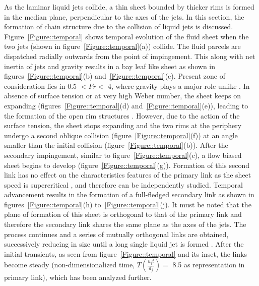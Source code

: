 \documentclass[%
 aip,
 sd,%
amsmath,amssymb,
preprint,%
author-year,%
]{revtex4-1}
\begin{document}
As the laminar liquid jets collide, a thin sheet bounded by thicker rims is formed in the median plane, perpendicular to the axes of the jets. In this section, the {\color{red}formation} of chain structure due to the collision of liquid jets is discussed. Figure~\ref{Figure::temporal} shows temporal evolution of the fluid sheet when the two jets (shown in figure~\ref{Figure::temporal}(a)) collide. The fluid parcels are dispatched radially outwards from the point of impingement. This along with net inertia of jets and gravity results in a bay leaf like sheet as shown in figures~\ref{Figure::temporal}(b) and~\ref{Figure::temporal}(c). Present zone of consideration lies in 0.5 $< Fr <$ 4, where gravity plays a major role unlike \cite{bush2004collision,bremond2006atomization}. In absence of surface tension or at very high Weber number, the sheet keeps on expanding (figures~\ref{Figure::temporal}(d) and~\ref{Figure::temporal}(e)), leading to the formation of the open rim structures \citep{taylor1960formation,chen2013high}. However, {\color{red}due to the action of the surface tension, the sheet stops expanding and} the two rims at the periphery undergo a second oblique collision (figure~\ref{Figure::temporal}(f)) at an angle smaller than the initial collision (figure~\ref{Figure::temporal}(b)). After the secondary impingement, similar to figure~\ref{Figure::temporal}(c), a flow biased sheet begins to develop (figure~\ref{Figure::temporal}(g)). Formation of this second link has no effect on the characteristics features of the primary link as the sheet speed is supercritical \citep{bush2004collision}, and therefore can be independently studied. Temporal advancement results in the formation of a full-fledged secondary link as shown in figures~\ref{Figure::temporal}(h) to~\ref{Figure::temporal}(j). It must be noted that the plane of formation of this sheet is orthogonal to that of the primary link and therefore the secondary link shares the same plane as the axes of the jets. The process continues and a series of mutually orthogonal links are obtained, successively reducing in size until a long single liquid jet is formed \citep{bush2004collision}. After the initial transients, as seen from figure~\ref{Figure::temporal} and its inset, the links become steady (non-dimensionalized time, $T \left(\frac{u_jt}{d_j}\right) = $ 8.5 as representation in primary link), which has been analyzed further. \\
\end{document}
